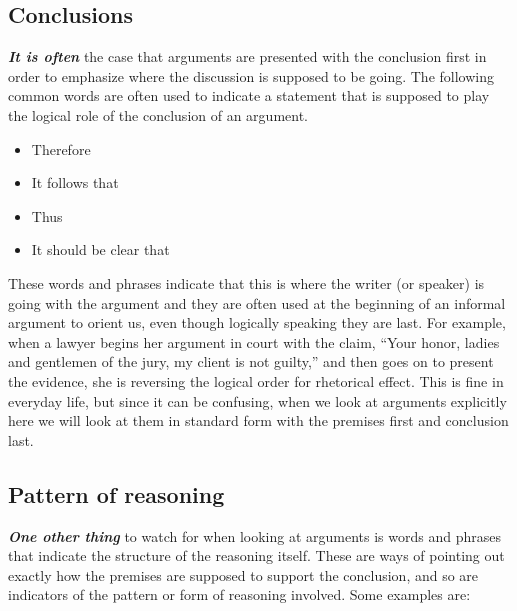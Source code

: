 \documentclass[12pt, openany]{book}
\makeatletter
\providecommand{\tightlist}{%
  \setlength{\itemsep}{0pt}\setlength{\parskip}{0pt}}
\newenvironment{kframe}{%
\medskip{}
\setlength{\fboxsep}{.8em}
 \def\at@end@of@kframe{}%
 \ifinner\ifhmode%
  \def\at@end@of@kframe{\end{minipage}}%
  \begin{minipage}{\columnwidth}%
 \fi\fi%
 \def\FrameCommand##1{\hskip\@totalleftmargin \hskip-\fboxsep
 \colorbox{shadecolor}{##1}\hskip-\fboxsep
     \hskip-\linewidth \hskip-\@totalleftmargin \hskip\columnwidth}%
 \MakeFramed {\advance\hsize-\width
   \@totalleftmargin\z@ \linewidth\hsize
   \@setminipage}}%
 {\par\unskip\endMakeFramed%
 \at@end@of@kframe}
\newenvironment{rmdblock}[1]
  {
  \begin{itemize}
  \renewcommand{\labelitemi}{
    \raisebox{-.7\height}[0pt][0pt]{
      {\setkeys{Gin}{width=3em,keepaspectratio}\texttt{[image: img/\#1]}}
    }
  }
  \setlength{\fboxsep}{1em}
  \begin{kframe}
  \item
  }
  {
  \end{kframe}
  \end{itemize}
  }
\newenvironment{note}
  {\begin{rmdblock}{note}}
  {\end{rmdblock}}
\makeatother
\begin{document}
\hypertarget{conclusions}{%
\subsection*{Conclusions}\label{conclusions}}


\textbf{\emph{It is often}} the case that arguments are presented with the conclusion first in order to emphasize where the discussion is supposed to be going. The following common words are often used to indicate a statement that is supposed to play the logical role of the conclusion of an argument.

\begin{note}

\begin{itemize}
\tightlist
\item
  Therefore
\item
  It follows that
\item
  Thus
\item
  It should be clear that
\end{itemize}

\end{note}

These words and phrases indicate that this is where the writer (or speaker) is going with the argument and they are often used at the beginning of an informal argument to orient us, even though logically speaking they are last. For example, when a lawyer begins her argument in court with the claim, ``Your honor, ladies and gentlemen of the jury, my client is not guilty,'' and then goes on to present the evidence, she is reversing the logical order for rhetorical effect. This is fine in everyday life, but since it can be confusing, when we look at arguments explicitly here we will look at them in standard form with the premises first and conclusion last.

\hypertarget{pattern-of-reasoning}{%
\subsection*{Pattern of reasoning}\label{pattern-of-reasoning}}


\textbf{\emph{One other thing}} to watch for when looking at arguments is words and phrases that indicate the structure of the reasoning itself. These are ways of pointing out exactly how the premises are supposed to support the conclusion, and so are indicators of the pattern or form of reasoning involved. Some examples are:
\end{document}
